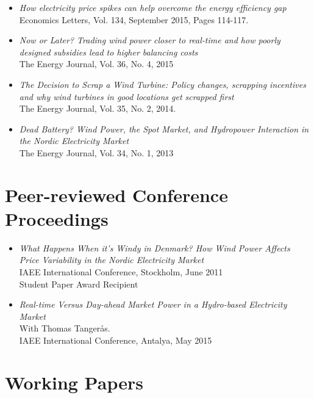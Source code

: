 \documentclass[margin]{res}
\begin{document}
\begin{resume}
\begin{itemize}
\item[] \emph{How electricity price spikes can help overcome the energy efficiency gap}\\
Economics Letters, Vol. 134, September 2015, Pages 114-117.

\item[] \emph{Now or Later? Trading wind power closer to real-time and how poorly designed subsidies lead to higher balancing costs}\\
The Energy Journal, Vol. 36, No. 4, 2015 

\item[] \emph{The Decision to Scrap a Wind Turbine: Policy changes, scrapping incentives and why wind turbines in good locations get scrapped first}\\
The Energy Journal, Vol. 35, No. 2, 2014.

\item[] \emph{Dead Battery? Wind Power, the Spot Market, and Hydropower Interaction in the Nordic Electricity Market}\\
The Energy Journal, Vol. 34, No. 1, 2013
\end{itemize}

\normalsize{\section{Peer-reviewed Conference Proceedings}}
\begin{itemize}  
\setlength{\itemsep}{10pt}
\item[] \emph{What Happens When it's Windy in Denmark? How Wind Power Affects Price Variability in the Nordic Electricity Market}\\ 
IAEE International Conference, Stockholm, June 2011  \\
Student Paper Award Recipient 

\item[] \emph{Real-time Versus Day-ahead Market Power in a Hydro-based Electricity Market} \\ 
With Thomas Tanger\aa s. \\
IAEE International Conference, Antalya, May 2015
\end{itemize}

\normalsize{\section{Working Papers}}
\begin{itemize}  
\setlength{\itemsep}{10pt}


\end{itemize}
\end{resume}
\end{document}

